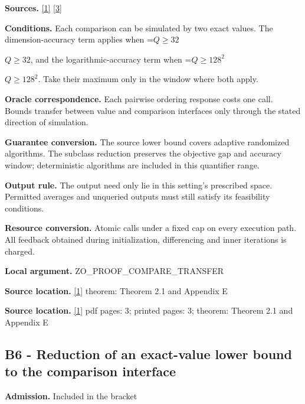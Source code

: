 \documentclass[10pt,a4paper]{article}
\newcommand{\AtlasMath}[1]{\par\begingroup\centering\setbox0=\hbox{$\displaystyle #1$}\ifdim\wd0>1.4\linewidth\typeout{ATLAS WIDE FORMULA: \the\wd0}\fi\ifdim\wd0>\linewidth\resizebox{\linewidth}{!}{\box0}\else\box0\fi\par\endgroup}
\newcommand{\AtlasInlineMath}[1]{\begingroup\setbox0=\hbox{$#1$}\ifdim\wd0>.4\linewidth\endgroup\AtlasMath{#1}\else\endgroup$#1$\fi}
\begin{document}
\textbf{Sources.} \href{https://arxiv.org/html/2610.00345v1}{[1]} \href{https://arxiv.org/html/2610.19652v1}{[3]}



\textbf{Conditions.} Each comparison can be simulated by two exact values. The dimension-accuracy term applies when \AtlasInlineMath{Q\ge32}, and the logarithmic-accuracy term when \AtlasInlineMath{Q\ge128^2}. Take their maximum only in the window where both apply.



\textbf{Oracle correspondence.} Each pairwise ordering response costs one call. Bounds transfer between value and comparison interfaces only through the stated direction of simulation.



\textbf{Guarantee conversion.} The source lower bound covers adaptive randomized algorithms. The subclass reduction preserves the objective gap and accuracy window; deterministic algorithms are included in this quantifier range.



\textbf{Output rule.} The output need only lie in this setting's prescribed space. Permitted averages and unqueried outputs must still satisfy its feasibility conditions.



\textbf{Resource conversion.} Atomic calls under a fixed cap on every execution path. All feedback obtained during initialization, differencing and inner iterations is charged.



\textbf{Local argument.} ZO\_PROOF\_COMPARE\_TRANSFER



\textbf{Source location.} \href{https://arxiv.org/html/2610.00345v1}{[1]} theorem: Theorem 2.1 and Appendix E



\textbf{Source location.} \href{https://arxiv.org/html/2610.00345v1}{[1]} pdf pages: 3; printed pages: 3; theorem: Theorem 2.1 and Appendix E



\subsection{B6 - Reduction of an exact-value lower bound to the comparison interface}


\textbf{Admission.} Included in the bracket
\end{document}
